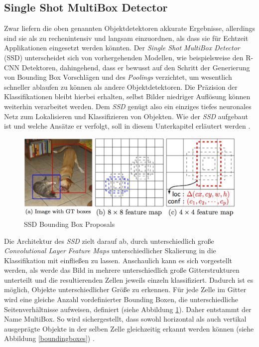 \subsection*{Single Shot MultiBox Detector}

Zwar liefern die oben genannten Objektdetektoren akkurate Ergebnisse, allerdings sind sie als zu rechenintensiv und langsam einzuordnen, als dass sie für Echtzeit Applikationen eingesetzt werden könnten. Der \textit{Single Shot MultiBox Detector} (SSD) unterscheidet sich von vorhergehenden Modellen, wie beispielsweise den R-CNN Detektoren, dahingehend, dass er bewusst auf den Schritt der Generierung von Bounding Box Vorschlägen und des \textit{Poolings} verzichtet, um wesentlich schneller ablaufen zu können als andere Objektdetektoren. Die Präzision der Klassifikationen bleibt hierbei erhalten, selbst Bilder niedriger Auflösung können weiterhin verarbeitet werden. Dem \textit{SSD} genügt also ein einziges tiefes neuronales Netz zum Lokalisieren und Klassifizieren von Objekten. Wie der \textit{SSD} aufgebaut ist und welche Ansätze er verfolgt, soll in diesem Unterkapitel erläutert werden \cite{ssd.20161229}. 

\begin{figure}[ht]
	\begin{center}
		\includegraphics[width=15cm]{Bilder/ssd_framework.png} 
		\caption[SSD Bounding Box Proposals]{SSD Bounding Box Proposals \cite{ssd.20161229}}
		\label{framework}
	\end{center}
\end{figure}

Die Architektur des \textit{SSD} zielt darauf ab, durch unterschiedlich große \textit{Convolutional Layer} \textit{Feature Maps} unterschiedlicher Skalierung in die Klassifikation mit einfließen zu lassen. Anschaulich kann es sich vorgestellt werden, als werde das Bild in mehrere unterschiedlich große Gitterstrukturen unterteilt und die resultierenden Zellen jeweils einzeln klassifiziert. Dadurch ist es möglich, Objekte unterschiedlicher Größe zu erkennen. Für jede Zelle im Gitter wird eine gleiche Anzahl vordefinierter Bounding Boxen, die unterschiedliche Seitenverhältnisse aufweisen, definiert (siehe Abbildung \ref{framework}). Daher entstammt der Name \glqq MultiBox\grqq[]. So wird sichergestellt, dass sowohl horizontal als auch vertikal ausgeprägte Objekte in der selben Zelle gleichzeitig erkannt werden können (siehe Abbildung \ref{boundingboxes}) \cite{ssd.20161229}.

